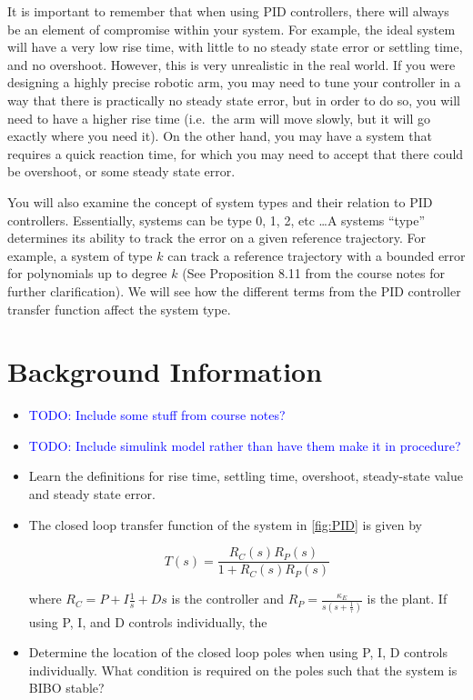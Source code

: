 It is important to remember that when using  PID controllers, there will always be an element of
compromise within your system. For example, the ideal system will have a very low rise time, with
little to no steady state error or settling time, and no overshoot. However, this is very unrealistic in
the real world. If you were designing a highly precise robotic arm, you may need to tune your
controller in a way that there is practically no steady state error, but in order to do so, you will need to
have a higher rise time (i.e.\ the arm will move slowly, but it will go exactly where you need it). On
the other hand, you may have a system that requires a quick reaction time, for which you may need
to accept that there could be overshoot, or some steady state error.

You will also examine the concept of system types and their relation to PID controllers. Essentially,
systems can be type 0, 1, 2, etc \ldots A systems ``type'' determines its ability to track
the error on a given reference trajectory. For example, a system of type \(k \) can track
a reference trajectory with a bounded error for polynomials up to degree \(k \) (See Proposition
8.11 from the course notes for further clarification). We will see how the different terms from the PID controller transfer function affect the system type.

\section{Background Information}

\begin{itemize}
    \item \textcolor{blue}{TODO: Include some stuff from course notes?}
    \item \textcolor{blue}{TODO: Include simulink model rather than have them make it in procedure?}
    \item Learn the definitions for rise time, settling time, overshoot, steady-state value and steady state error.
    \item The closed loop transfer function of the system in \ref{fig:PID} is given by

          \begin{equation*}\label{eq:transfer}
              T(s)= \frac{R_{C}(s)R_{P}(s)}{1+R_{C}(s)R_{P}(s)}
          \end{equation*}

          where \( R_C = P + I\frac{1}{s} + Ds \) is the controller and \( R_P = \frac{\kappa_E}{s(s+\frac{1}{\tau})} \) is the plant. If using P, I, and D controls individually, the

    \item Determine the location of the closed loop poles when using P, I, D controls
          individually. What condition is required on the poles such that the system is BIBO stable?
\end{itemize}


